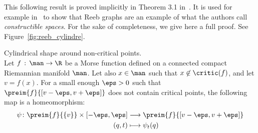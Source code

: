 This following result is proved implicitly in Theorem 3.1 in~\cite{milnor1963morse}. It is used for example in~\cite{de2016categorified} to show that Reeb graphs are an example of what the authors call {\it constructible spaces}. For the sake of completeness, we give here a full proof. See Figure~\ref{fig:reeb_cylindre}.

\begin{theorem}{Cylindrical shape around non-critical points.}\label{thm:morse}\\
Let $f\,:\,\man\rightarrow \R$ be a Morse function defined on a connected compact Riemannian manifold $\man$. Let also $x\in\man$ such that $x\not\in \critic(f)$, 
and let $v=f(x)$. 
For a small enough $\eps>0$ such that $\preim{f}{[v-\eps,v+\eps]}$ does not contain critical points, the following map is a homeomorphism:
\begin{align*}
\psi\colon \preim{f}{\{v\}}\times[-\eps,\eps] &\longrightarrow \preim{f}{[v-\eps,v+\eps]}  \\
(q,t)&\longmapsto \psi_{t}(q)
\end{align*}
\end{theorem}

